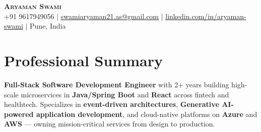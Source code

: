 \documentclass[letterpaper,12pt]{article}
\begin{document}
\begin{center}
    \textbf{\Huge \scshape Aryaman Swami} \\ \vspace{2pt}
    \small
    +91 9617949056 $|$
    \href{mailto:swamiaryaman21.as@gmail.com}{swamiaryaman21.as@gmail.com} $|$
    \href{https://linkedin.com/in/aryaman-swami}{linkedin.com/in/aryaman-swami} $|$
    {Pune, India}
\end{center}
\section{Professional Summary}
\small \textbf{Full-Stack Software Development Engineer} with 2+ years building high-scale microservices in \textbf{Java/Spring Boot} and \textbf{React} across fintech and healthtech. Specializes in \textbf{event-driven architectures}, \textbf{Generative AI-powered application development}, and cloud-native platforms on \textbf{Azure} and \textbf{AWS} --- owning mission-critical services from design to production.
\end{document}
